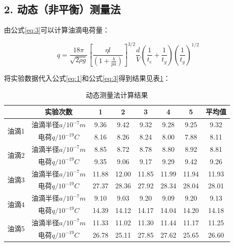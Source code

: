 \documentclass[12pt,a4paper,UTF8]{ctexart}
\begin{document}
\subsection*{2.	动态（非平衡）测量法}

由公式\ref*{eq:3}可以计算油滴电荷量：

\begin{equation}\label{eq:3}
    q=\frac{18\pi}{\sqrt{2\rho g}}\left[\frac{\eta l}{\left(1+\frac{b}{pa}\right) }\right]^{3/2} \frac{d}{V} \left(\frac{1}{t_e}+\frac{1}{t_g}\right) \left(\frac{1}{t_g}\right)^{1/2}  
\end{equation}

将实验数据代入公式\ref{eq:1}和公式\ref*{eq:3}得到结果见表\ref*{tab:4}：

\begin{table}[!h]
	\centering
	\caption{动态测量法计算结果}	  
	\begin{tabular}{c|ccccccc}
	\toprule
	\multicolumn{1}{c}{} & 实验次数  & 1  & 2   & 3 & 4 & 5 &平均值  \\
	\midrule
	\multicolumn{1}{c}{\multirow{2}[2]{*}{油滴1}} & 油滴半径$a/10^{-7}m$     & 9.36 & 9.42 & 9.32 & 9.28 & 9.25 & 9.32\\
	\multicolumn{1}{c}{} & 电荷$q/10^{-19}C$     & 8.16 & 8.26 & 8.24 & 8.00 & 7.88 & 8.11\\
	\midrule
	\multicolumn{1}{c}{\multirow{2}[2]{*}{油滴2}} & 油滴半径$a/10^{-7}m$     & 8.85 & 8.72 & 8.78 & 8.80 & 8.92 & 8.81\\
	\multicolumn{1}{c}{} & 电荷$q/10^{-19}C$    & 9.35 & 9.06  & 9.17 & 9.29 & 9.42 & 9.26\\
    \midrule
	\multicolumn{1}{c}{\multirow{2}[2]{*}{油滴3}} & 油滴半径$a/10^{-7}m$      & 11.88 & 12.00 & 11.85 & 11.99 & 11.94 & 11.93\\
	\multicolumn{1}{c}{} & 电荷$q/10^{-19}C$     & 27.37 & 28.36 & 27.92 & 28.34 & 28.04 & 28.01\\
	\midrule
	\multicolumn{1}{c}{\multirow{2}[2]{*}{油滴4}} & 油滴半径$a/10^{-7}m$      & 9.10 & 9.03 & 9.20 & 9.09 & 9.20 & 9.13\\
	\multicolumn{1}{c}{} & 电荷$q/10^{-19}C$     & 14.39 & 14.12  & 14.17 & 14.04 & 14.20 & 14.18\\
    \midrule
    \multicolumn{1}{c}{\multirow{2}[2]{*}{油滴5}} & 油滴半径$a/10^{-7}m$      & 11.33 & 11.02 & 11.30 & 11.44 & 11.17 & 11.25\\
	\multicolumn{1}{c}{} & 电荷$q/10^{-19}C$     & 26.78 & 25.11 & 27.85 & 27.62 & 25.65 & 26.60\\
	\bottomrule
	\end{tabular}%
    \label{tab:4}
\end{table}%
\end{document}
